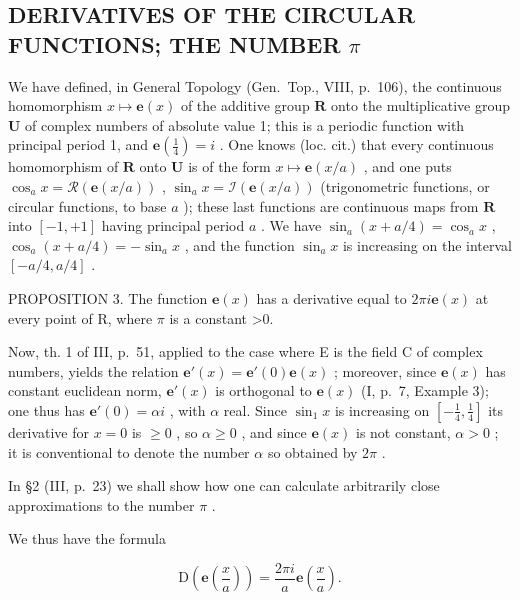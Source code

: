 \subsection{\texorpdfstring{DERIVATIVES OF THE CIRCULAR FUNCTIONS; THE NUMBER \(\pi\)}{DERIVATIVES OF THE CIRCULAR FUNCTIONS; THE NUMBER PI}}

We have defined, in General Topology (Gen.~Top., VIII, p.~106), the continuous homomorphism \(x \mapsto \mathbf{e}(x)\) of the additive group \(\mathbf{R}\) onto the multiplicative group \(\mathbf{U}\) of complex numbers of absolute value 1; this is a periodic function with principal period 1, and \(\mathbf{e}\left(\frac{1}{4}\right) = i\) . One knows (loc. cit.) that every continuous homomorphism of \(\mathbf{R}\) onto \(\mathbf{U}\) is of the form \(x \mapsto \mathbf{e}(x / a)\) , and one puts \(\cos_a x = \mathcal{R}(\mathbf{e}(x / a))\) , \(\sin_a x = \mathcal{I}(\mathbf{e}(x / a))\) (trigonometric functions, or circular functions, to base \(a\) ); these last functions are continuous maps from \(\mathbf{R}\) into \([-1, +1]\) having principal period \(a\) . We have \(\sin_a(x + a / 4) = \cos_a x\) , \(\cos_a(x + a / 4) = -\sin_a x\) , and the function \(\sin_a x\) is increasing on the interval \([-a / 4, a / 4]\) .

PROPOSITION 3. The function \(\mathbf{e}(x)\) has a derivative equal to \(2\pi i\mathbf{e}(x)\) at every point of R, where \(\pi\) is a constant \textgreater0.

Now, th. 1 of III, p.~51, applied to the case where E is the field C of complex numbers, yields the relation \(\mathbf{e}'(x) = \mathbf{e}'(0)\mathbf{e}(x)\) ; moreover, since \(\mathbf{e}(x)\) has constant euclidean norm, \(\mathbf{e}'(x)\) is orthogonal to \(\mathbf{e}(x)\) (I, p.~7, Example 3); one thus has \(\mathbf{e}'(0) = \alpha i\) , with \(\alpha\) real. Since \(\sin_1 x\) is increasing on \([- \frac{1}{4}, \frac{1}{4}]\) its derivative for \(x = 0\) is \(\geqslant 0\) , so \(\alpha \geqslant 0\) , and since \(\mathbf{e}(x)\) is not constant, \(\alpha > 0\) ; it is conventional to denote the number \(\alpha\) so obtained by \(2\pi\) .

In §2 (III, p.~23) we shall show how one can calculate arbitrarily close approximations to the number \(\pi\) .

We thus have the formula

\[
\mathrm{D} \left(\mathbf {e} \left(\frac {x}{a}\right)\right) = \frac {2 \pi i}{a} \mathbf {e} \left(\frac {x}{a}\right).\tag{12}
\]

